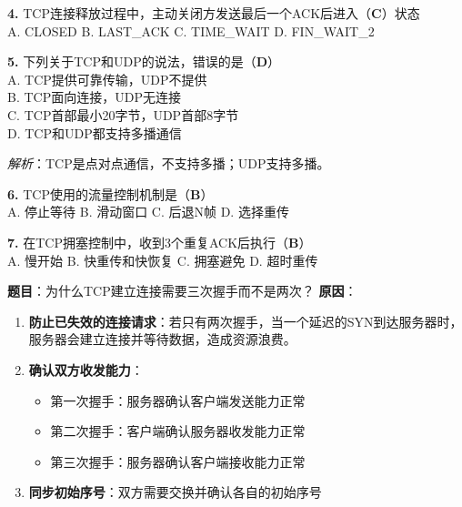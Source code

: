 \begin{examplebox}[选择题（补充）]
\textbf{4.} TCP连接释放过程中，主动关闭方发送最后一个ACK后进入（\textbf{C}）状态\\
A. CLOSED \quad B. LAST\_ACK \quad C. TIME\_WAIT \quad D. FIN\_WAIT\_2

\textbf{5.} 下列关于TCP和UDP的说法，错误的是（\textbf{D}）\\
A. TCP提供可靠传输，UDP不提供\\
B. TCP面向连接，UDP无连接\\
C. TCP首部最小20字节，UDP首部8字节\\
D. TCP和UDP都支持多播通信

\textit{解析}：TCP是点对点通信，不支持多播；UDP支持多播。

\textbf{6.} TCP使用的流量控制机制是（\textbf{B}）\\
A. 停止等待 \quad B. 滑动窗口 \quad C. 后退N帧 \quad D. 选择重传

\textbf{7.} 在TCP拥塞控制中，收到3个重复ACK后执行（\textbf{B}）\\
A. 慢开始 \quad B. 快重传和快恢复 \quad C. 拥塞避免 \quad D. 超时重传
\end{examplebox}

\begin{examplebox}
\textbf{题目}：为什么TCP建立连接需要三次握手而不是两次？
\tcblower
\textbf{原因}：
\begin{enumerate}[itemsep=0pt]
    \item \textbf{防止已失效的连接请求}：若只有两次握手，当一个延迟的SYN到达服务器时，服务器会建立连接并等待数据，造成资源浪费。
    
    \item \textbf{确认双方收发能力}：
    \begin{itemize}[itemsep=0pt]
        \item 第一次握手：服务器确认客户端发送能力正常
        \item 第二次握手：客户端确认服务器收发能力正常
        \item 第三次握手：服务器确认客户端接收能力正常
    \end{itemize}
    
    \item \textbf{同步初始序号}：双方需要交换并确认各自的初始序号
\end{enumerate}
\end{examplebox}

